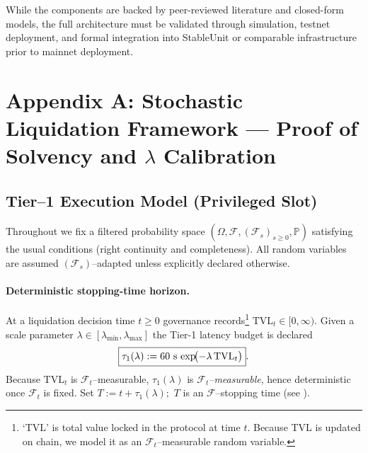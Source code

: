 \documentclass[11pt]{article}
\begin{document}
While the components are backed by peer-reviewed literature and closed-form models, the full architecture must be validated through simulation, testnet deployment, and formal integration into StableUnit or comparable infrastructure prior to mainnet deployment.

\clearpage
\appendix

\section*{Appendix A: Stochastic Liquidation Framework — Proof of Solvency and $\lambda$ Calibration}

\subsection{Tier–1 Execution Model (Privileged Slot)}
\label{subsec:tier1}

Throughout we fix a filtered probability space
$(\Omega,\mathcal F,(\mathcal F_s)_{s\ge0},\mathbb P)$ satisfying the
usual conditions (right continuity and completeness).
All random variables are assumed $(\mathcal F_s)$–adapted unless
explicitly declared otherwise.

\paragraph{Deterministic stopping-time horizon.}
At a liquidation decision time $t\!\ge0$ governance
records\footnote{%
`TVL' is total value locked in the protocol at time $t$.  Because TVL
is updated on chain, we model it as an $\mathcal F_t$–measurable
random variable.}
\(
   \mathrm{TVL}_t\in[0,\infty).
\)
Given a scale parameter
$\lambda\!\in[\lambda_{\min},\lambda_{\max}]$ the Tier-1 latency
budget is declared
\[
   \boxed{%
     \tau_1(\lambda)
       := 60 \text{ s}\,
          \exp\!\bigl(-\lambda\,\mathrm{TVL}_t\bigr)
   }.
\]
Because $\mathrm{TVL}_t$ is $\mathcal F_t$–measurable,
$\tau_1(\lambda)$ is \emph{$\mathcal F_t$–measurable}, hence
deterministic once $\mathcal F_t$ is fixed.  Set
\(
   T := t+\tau_1(\lambda);
\)
$T$ is an $\mathcal F$–stopping time
(see \textcite[Ex.\ 3.3.3]{karatzas1991}).
\end{document}

